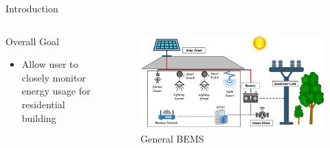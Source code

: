 \documentclass{beamer}
\begin{document}
\begin{frame}{Introduction}{}
\begin{columns}
{\begin{block}{Overall Goal}
\begin{itemize}
        \item Allow user to closely monitor energy usage for residential building
        \end{itemize}
      \end{block}
      }
    \begin{figure}
      \centering
      \includegraphics[scale=0.25]{figs/BEMS_Image.jpg}
      \caption{General BEMS}
      \label{fig:high_level_arch}
    \end{figure}
  \end{columns}
        
\end{frame}
\end{document}

